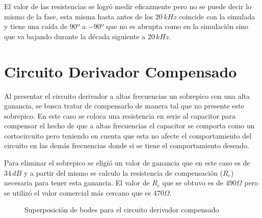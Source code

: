 \documentclass[11pt, a4paper]{article}
\begin{document}
El valor de las resistencias se logró medir eficazmente pero no se puede decir lo mismo de la fase, esta misma hasta antes de los $20 \, kHz$ coincide con la simulada y tiene una caída de $90º$ a $-90º$ que no es abrupta como en la simulación sino que va bajando durante la década siguiente a $20 \, kHz$.





\section{Circuito Derivador Compensado}
Al presentar el circuito derivador a altas frecuencias un sobrepico con una alta ganancia, se busca tratar de compensarlo de manera tal que no presente este sobrepico.
En este caso se coloca una resistencia en serie al capacitor para compensar el hecho de que a altas frecuencias el capacitor se comporta como un cortocircuito pero teniendo en cuenta que esta no afecte el comportamiento del circuito en las demás frecuencias donde si se tiene el comportamiento deseado.

Para eliminar el sobrepico se eligió un valor de ganancia que en este caso es de $34 \, dB$ y a partir del mismo se calculo la resistencia de compensación ($R_c$) necesaria para tener esta ganancia. El valor de $R_c$ que se obtuvo es de $490 \Omega$ pero se utilizó el valor comercial más cercano que es $470 \Omega$.

\begin{figure}[H]
	\begin{center}
		\caption{Superposición de bodes para el circuito derivador compensado}
		\label{fig:superposicion3casosderivadorCOMPENSADO}
	\end{center}
\end{figure}
\end{document}
